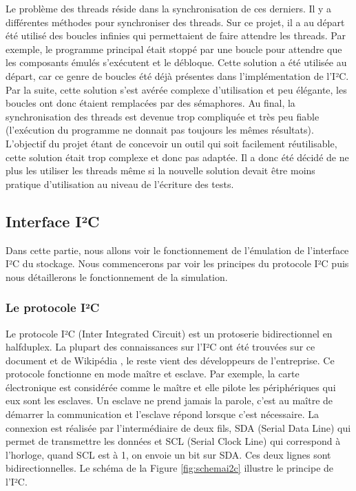 \documentclass[a4paper]{article}
\begin{document}
Le problème des threads réside dans la synchronisation de ces derniers. Il y a
différentes méthodes pour synchroniser des threads. Sur ce projet, il a au
départ été utilisé des boucles infinies qui permettaient de faire attendre les
threads. Par exemple, le programme principal était stoppé par une boucle pour
attendre que les composants émulés s'exécutent et le débloque. Cette solution
a été utilisée au départ, car ce genre de boucles été déjà présentes dans
l'implémentation de l'I²C. Par la suite, cette solution s'est avérée complexe
d'utilisation et peu élégante, les boucles ont donc étaient remplacées par des %
sémaphores. Au final, la synchronisation des threads est devenue trop compliquée
et très peu fiable (l'exécution du programme ne donnait pas toujours les mêmes
résultats). L'objectif du projet étant de concevoir un outil qui soit facilement
réutilisable, cette solution était trop complexe et donc pas adaptée. Il a donc
été décidé de ne plus les utiliser les threads même si la nouvelle solution
devait être moins pratique d'utilisation au niveau de l'écriture des tests.
\subsection{Interface I²C}%

Dans cette partie, nous allons voir le fonctionnement de l'émulation de
l'interface I²C du stockage. Nous commencerons par voir les principes du
protocole I²C puis nous détaillerons le fonctionnement de la simulation.

\subsubsection*{Le protocole I²C}

Le protocole I²C (Inter Integrated Circuit) est un \gls{protoserie}
bidirectionnel en \gls{halfduplex}. La plupart des connaissances sur l'I²C ont
été trouvées sur ce document \cite{mankar2014review} et de Wikipédia
\cite{frwiki:197726464}, le reste vient des développeurs de l'entreprise. Ce
protocole fonctionne en mode maître et esclave. Par exemple, la carte
électronique est considérée comme le maître et elle pilote les périphériques qui
eux sont les esclaves. Un esclave ne prend jamais la parole, c'est au maître de
démarrer la communication et l'esclave répond lorsque c'est nécessaire. La
connexion est réalisée par l'intermédiaire de deux fils, SDA (Serial Data Line)
qui permet de transmettre les données et SCL (Serial Clock Line) qui correspond
à l'horloge, quand SCL est à 1, on envoie un bit sur SDA. Ces deux lignes sont
bidirectionnelles. Le schéma de la Figure \ref{fig:schemai2c} illustre le
principe de l'I²C.
\end{document}
